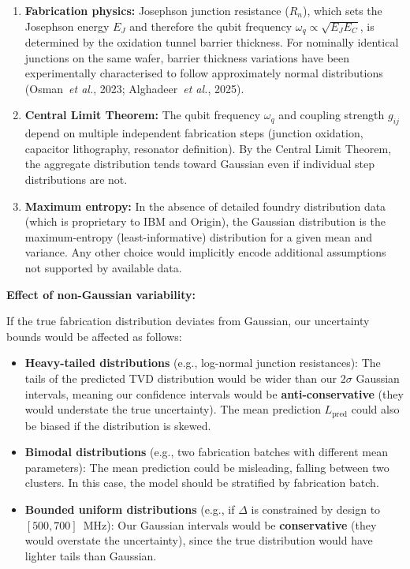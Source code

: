 \documentclass[11pt,a4paper]{article}
\begin{document}
\begin{enumerate}[leftmargin=*]
    \item \textbf{Fabrication physics:} Josephson junction resistance ($R_n$), which sets
    the Josephson energy $E_J$ and therefore the qubit frequency $\omega_q \propto
    \sqrt{E_J E_C}$, is determined by the oxidation tunnel barrier thickness. For nominally
    identical junctions on the same wafer, barrier thickness variations have been
    experimentally characterised to follow approximately normal distributions
    (Osman~\emph{et al.}, 2023; Alghadeer~\emph{et al.}, 2025).
    \item \textbf{Central Limit Theorem:} The qubit frequency $\omega_q$ and coupling
    strength $g_{ij}$ depend on multiple independent fabrication steps (junction oxidation,
    capacitor lithography, resonator definition). By the Central Limit Theorem, the
    aggregate distribution tends toward Gaussian even if individual step distributions
    are not.
    \item \textbf{Maximum entropy:} In the absence of detailed foundry distribution data
    (which is proprietary to IBM and Origin), the Gaussian distribution is the
    maximum-entropy (least-informative) distribution for a given mean and variance. Any
    other choice would implicitly encode additional assumptions not supported by available
    data.
\end{enumerate}

\medskip\noindent\textbf{Effect of non-Gaussian variability:}

If the true fabrication distribution deviates from Gaussian, our uncertainty bounds would
be affected as follows:

\begin{itemize}[leftmargin=*]
    \item \textbf{Heavy-tailed distributions} (e.g., log-normal junction resistances):
    The tails of the predicted TVD distribution would be wider than our $2\sigma$ Gaussian
    intervals, meaning our confidence intervals would be \textbf{anti-conservative} (they
    would understate the true uncertainty). The mean prediction $L_{\mathrm{pred}}$ could
    also be biased if the distribution is skewed.
    \item \textbf{Bimodal distributions} (e.g., two fabrication batches with different
    mean parameters): The mean prediction could be misleading, falling between two
    clusters. In this case, the model should be stratified by fabrication batch.
    \item \textbf{Bounded uniform distributions} (e.g., if $\Delta$ is constrained by
    design to $[500, 700]$~MHz): Our Gaussian intervals would be \textbf{conservative}
    (they would overstate the uncertainty), since the true distribution would have lighter
    tails than Gaussian.
\end{itemize}
\end{document}
